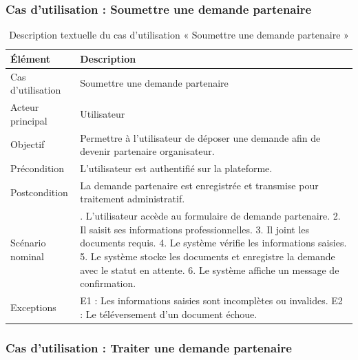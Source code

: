 \subsubsection{Cas d’utilisation : Soumettre une demande partenaire}


\begin{table}[H]
\centering
\caption{Description textuelle du cas d’utilisation « Soumettre une demande partenaire »}
\label{tableau:4-2}
\renewcommand{\arraystretch}{1.2}
\begin{tabularx}{\textwidth}{|>{\raggedright\arraybackslash}X|>{\raggedright\arraybackslash}X|}
\hline
\rowcolor[HTML]{ECF4FF}
\textbf{Élément} & \textbf{Description} \\
\hline
Cas d’utilisation & Soumettre une demande partenaire \\
\hline
Acteur principal & Utilisateur \\
\hline
Objectif & Permettre à l’utilisateur de déposer une demande afin de devenir partenaire organisateur. \\
\hline
Précondition & L’utilisateur est authentifié sur la plateforme. \\
\hline
Postcondition & La demande partenaire est enregistrée et transmise pour traitement administratif. \\
\hline
Scénario nominal & 1. L’utilisateur accède au formulaire de demande partenaire.\newline{} 2. Il saisit ses informations professionnelles.\newline{} 3. Il joint les documents requis.\newline{} 4. Le système vérifie les informations saisies.\newline{} 5. Le système stocke les documents et enregistre la demande avec le statut en attente.\newline{} 6. Le système affiche un message de confirmation. \\
\hline
Exceptions & E1 : Les informations saisies sont incomplètes ou invalides.\newline{} E2 : Le téléversement d’un document échoue. \\
\hline
\end{tabularx}
\end{table}


\subsubsection{Cas d’utilisation : Traiter une demande partenaire}


